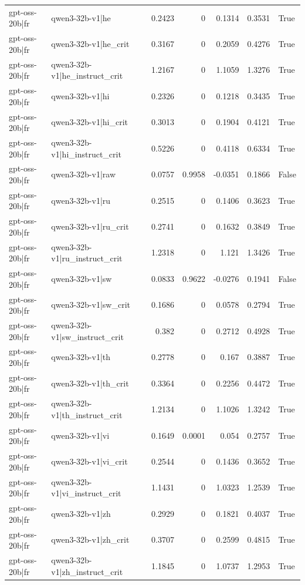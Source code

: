 \begin{table}
\begin{tabular}{l l r r r r l}
gpt-oss-20b|fr & qwen3-32b-v1|he & 0.2423 & 0 & 0.1314 & 0.3531 & True \\
gpt-oss-20b|fr & qwen3-32b-v1|he_crit & 0.3167 & 0 & 0.2059 & 0.4276 & True \\
gpt-oss-20b|fr & qwen3-32b-v1|he_instruct_crit & 1.2167 & 0 & 1.1059 & 1.3276 & True \\
gpt-oss-20b|fr & qwen3-32b-v1|hi & 0.2326 & 0 & 0.1218 & 0.3435 & True \\
gpt-oss-20b|fr & qwen3-32b-v1|hi_crit & 0.3013 & 0 & 0.1904 & 0.4121 & True \\
gpt-oss-20b|fr & qwen3-32b-v1|hi_instruct_crit & 0.5226 & 0 & 0.4118 & 0.6334 & True \\
gpt-oss-20b|fr & qwen3-32b-v1|raw & 0.0757 & 0.9958 & -0.0351 & 0.1866 & False \\
gpt-oss-20b|fr & qwen3-32b-v1|ru & 0.2515 & 0 & 0.1406 & 0.3623 & True \\
gpt-oss-20b|fr & qwen3-32b-v1|ru_crit & 0.2741 & 0 & 0.1632 & 0.3849 & True \\
gpt-oss-20b|fr & qwen3-32b-v1|ru_instruct_crit & 1.2318 & 0 & 1.121 & 1.3426 & True \\
gpt-oss-20b|fr & qwen3-32b-v1|sw & 0.0833 & 0.9622 & -0.0276 & 0.1941 & False \\
gpt-oss-20b|fr & qwen3-32b-v1|sw_crit & 0.1686 & 0 & 0.0578 & 0.2794 & True \\
gpt-oss-20b|fr & qwen3-32b-v1|sw_instruct_crit & 0.382 & 0 & 0.2712 & 0.4928 & True \\
gpt-oss-20b|fr & qwen3-32b-v1|th & 0.2778 & 0 & 0.167 & 0.3887 & True \\
gpt-oss-20b|fr & qwen3-32b-v1|th_crit & 0.3364 & 0 & 0.2256 & 0.4472 & True \\
gpt-oss-20b|fr & qwen3-32b-v1|th_instruct_crit & 1.2134 & 0 & 1.1026 & 1.3242 & True \\
gpt-oss-20b|fr & qwen3-32b-v1|vi & 0.1649 & 0.0001 & 0.054 & 0.2757 & True \\
gpt-oss-20b|fr & qwen3-32b-v1|vi_crit & 0.2544 & 0 & 0.1436 & 0.3652 & True \\
gpt-oss-20b|fr & qwen3-32b-v1|vi_instruct_crit & 1.1431 & 0 & 1.0323 & 1.2539 & True \\
gpt-oss-20b|fr & qwen3-32b-v1|zh & 0.2929 & 0 & 0.1821 & 0.4037 & True \\
gpt-oss-20b|fr & qwen3-32b-v1|zh_crit & 0.3707 & 0 & 0.2599 & 0.4815 & True \\
gpt-oss-20b|fr & qwen3-32b-v1|zh_instruct_crit & 1.1845 & 0 & 1.0737 & 1.2953 & True \\

\end{tabular}
\end{table}
